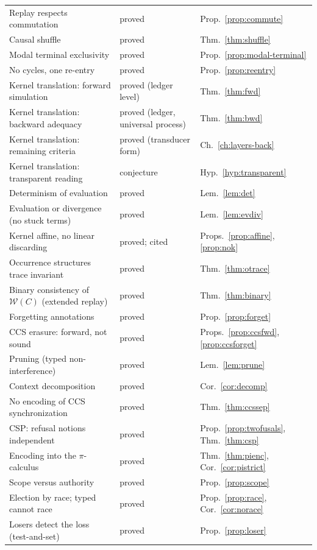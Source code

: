 \documentclass[11pt,openany]{book}
\theoremstyle{remark}
\begin{document}
{\begin{longtable}{L{6.2cm}L{4.4cm}l}
Replay respects commutation & proved & Prop.~\ref{prop:commute}\\
Causal shuffle & proved & Thm.~\ref{thm:shuffle}\\
Modal terminal exclusivity & proved & Prop.~\ref{prop:modal-terminal}\\
No cycles, one re-entry & proved & Prop.~\ref{prop:reentry}\\
Kernel translation: forward simulation & proved (ledger level) & Thm.~\ref{thm:fwd}\\
Kernel translation: backward adequacy & proved (ledger, universal process) & Thm.~\ref{thm:bwd}\\
Kernel translation: remaining criteria & proved (transducer form) & Ch.~\ref{ch:layers-back}\\
Kernel translation: transparent reading & conjecture & Hyp.~\ref{hyp:transparent}\\
Determinism of evaluation & proved & Lem.~\ref{lem:det}\\
Evaluation or divergence (no stuck terms) & proved & Lem.~\ref{lem:evdiv}\\
Kernel affine, no linear discarding & proved; cited & Props.~\ref{prop:affine}, \ref{prop:nok}\\
Occurrence structures trace invariant & proved & Thm.~\ref{thm:otrace}\\
Binary consistency of $\mathcal W(C)$ (extended replay) & proved & Thm.~\ref{thm:binary}\\
Forgetting annotations & proved & Prop.~\ref{prop:forget}\\
CCS erasure: forward, not sound & proved & Props.~\ref{prop:ccsfwd}, \ref{prop:ccsforget}\\
Pruning (typed non-interference) & proved & Lem.~\ref{lem:prune}\\
Context decomposition & proved & Cor.~\ref{cor:decomp}\\
No encoding of CCS synchronization & proved & Thm.~\ref{thm:ccssep}\\
CSP: refusal notions independent & proved & Prop.~\ref{prop:twofusals}, Thm.~\ref{thm:csp}\\
Encoding into the $\pi$-calculus & proved & Thm.~\ref{thm:pienc}, Cor.~\ref{cor:pistrict}\\
Scope versus authority & proved & Prop.~\ref{prop:scope}\\
Election by race; typed cannot race & proved & Prop.~\ref{prop:race}, Cor.~\ref{cor:norace}\\
Losers detect the loss (test-and-set) & proved & Prop.~\ref{prop:loser}\\

\end{longtable}}
\end{document}

